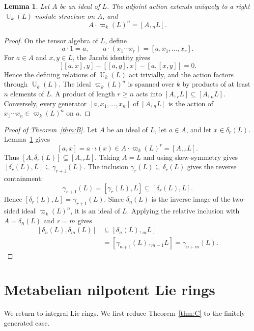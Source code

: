 \documentclass[a4paper,11pt,reqno]{amsart}
\newtheorem{lemma}[theorem]{Lemma}
\theoremstyle{definition}
\newcommand{\U}{\operatorname U}
\begin{document}
\begin{lemma}\label{lem:adjoint-enveloping-action}
Let $A$ be an ideal of $L$.  The adjoint action extends uniquely to a right
$\U_k(L)$-module structure on $A$, and
\[
                         A\cdot\varpi_k(L)^n=[A,{}_nL].
\]
\end{lemma}

\begin{proof}
On the tensor algebra of $L$, define
\[
 a\cdot1=a,
 \qquad
 a\cdot(x_1\cdots x_r)=[a,x_1,\ldots,x_r].
\]
For $a\in A$ and $x,y\in L$, the Jacobi identity gives
\[
 [[a,x],y]-[[a,y],x]-[a,[x,y]]=0.
\]
Hence the defining relations of $\U_k(L)$ act trivially, and the action
factors through $\U_k(L)$.  The ideal $\varpi_k(L)^n$ is spanned over $k$
by products of at least $n$ elements of $L$.  A product of length $r\geq n$
acts into $[A,{}_rL]\subseteq[A,{}_nL]$.  Conversely, every generator
$[a,x_1,\ldots,x_n]$ of $[A,{}_nL]$ is the action of
$x_1\cdots x_n\in\varpi_k(L)^n$ on $a$.
\end{proof}

\begin{proof}[Proof of Theorem~\ref{thm:B}]
Let $A$ be an ideal of $L$, let $a\in A$, and let $x\in\delta_r(L)$.
Lemma~\ref{lem:adjoint-enveloping-action} gives
\[
 [a,x]=a\cdot\iota(x)
       \in A\cdot\varpi_k(L)^r
       =[A,{}_rL].
\]
Thus $[A,\delta_r(L)]\subseteq[A,{}_rL]$.  Taking $A=L$ and using
skew-symmetry gives
$[\delta_r(L),L]\subseteq\gamma_{r+1}(L)$.  The inclusion
$\gamma_r(L)\subseteq\delta_r(L)$ gives the reverse containment:
\[
 \gamma_{r+1}(L)=[\gamma_r(L),L]
                  \subseteq[\delta_r(L),L].
\]
Hence $[\delta_r(L),L]=\gamma_{r+1}(L)$.  Since $\delta_n(L)$ is the
inverse image of the two-sided ideal $\varpi_k(L)^n$, it is an ideal of
$L$.  Applying the relative inclusion with $A=\delta_n(L)$ and $r=m$
gives
\[
 \begin{aligned}
 [\delta_n(L),\delta_m(L)]
 &\subseteq[\delta_n(L),{}_mL]\\
 &=[\gamma_{n+1}(L),{}_{m-1}L]
  =\gamma_{n+m}(L).
 \end{aligned}
\]
\end{proof}

\section{Metabelian nilpotent Lie rings}\label{sec:vanishing}

We return to integral Lie rings.  We first reduce Theorem~\ref{thm:C} to
the finitely generated case.
\end{document}

